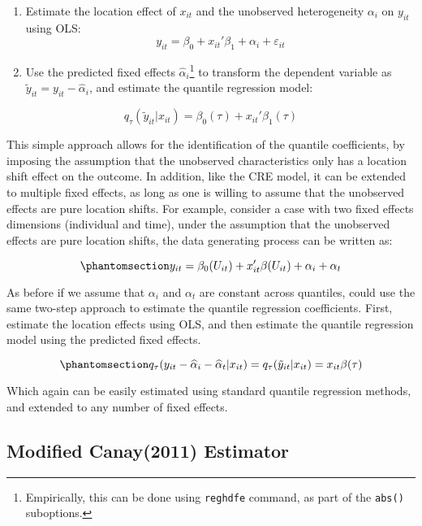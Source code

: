 \documentclass[bib]{statapress}
\begin{document}
\begin{enumerate}
\def\labelenumi{\arabic{enumi}.}
\item
  Estimate the location effect of \(x_{it}\) and the unobserved
  heterogeneity \(\alpha_i\) on \(y_{it}\) using OLS:
  \[y_{it}=\beta_0 +  x_{it}' \beta_1   +\alpha_i + \varepsilon_{it}
  \]
\item
  Use the predicted fixed effects \(\hat\alpha_i\)\footnote{Empirically,
    this can be done using \texttt{reghdfe} command, as part of the
    \texttt{abs()} suboptions.} to transform the dependent variable as
  \(\tilde y_{it}=y_{it}-\hat\alpha_i\), and estimate the quantile
  regression model:
\end{enumerate}

\[q_{\tau}(\tilde y_{it}|x_{it}) = \beta_0(\tau)+x_{it}'\beta_1(\tau)
\]

This simple approach allows for the identification of the quantile
coefficients, by imposing the assumption that the unobserved
characteristics only has a location shift effect on the outcome. In
addition, like the CRE model, it can be extended to multiple fixed
effects, as long as one is willing to assume that the unobserved effects
are pure location shifts. For example, consider a case with two fixed
effects dimensions (individual and time), under the assumption that the
unobserved effects are pure location shifts, the data generating process
can be written as:

\begin{equation}\phantomsection\label{eq-canay-dgp-2way}{y_{it} = \beta_0(U_{it}) + x_{it}'\beta(U_{it}) + \alpha_i + \alpha_t
}\end{equation}

As before if we assume that \(\alpha_i\) and \(\alpha_t\) are constant
across quantiles, could use the same two-step approach to estimate the
quantile regression coefficients. First, estimate the location effects
using OLS, and then estimate the quantile regression model using the
predicted fixed effects.

\begin{equation}\phantomsection\label{eq-canay-mway}{q_{\tau}(y_{it}-\hat \alpha_i - \hat \alpha_t|x_{it})=q_{\tau}(\tilde y_{it}|x_{it}) = x_{it}\beta(\tau)
}\end{equation}

Which again can be easily estimated using standard quantile regression
methods, and extended to any number of fixed effects.

\subsection{Modified Canay(2011) Estimator}\label{sec-mcanay}
\end{document}
